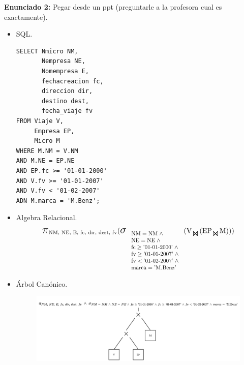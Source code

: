 \documentclass{templateNote}
\begin{document}
\textbf{Enunciado 2:}\newline
Pegar desde un ppt (preguntarle a la profesora cual es exactamente).
\begin{itemize}
    \item SQL.
    \begin{verbatim}
SELECT Nmicro NM,
       Nempresa NE,
       Nomempresa E,
       fechacreacion fc,
       direccion dir,
       destino dest,
       fecha_viaje fv
FROM Viaje V,
     Empresa EP,
     Micro M
WHERE M.NM = V.NM
AND M.NE = EP.NE
AND EP.fc >= '01-01-2000'
AND V.fv >= '01-01-2007'
AND V.fv < '01-02-2007'
ADN M.marca = 'M.Benz';
    \end{verbatim}

    \item Algebra Relacional.
    \begin{align*}
        \scalebox{1.5}{$\pi$}_{\text{NM, NE, E, fc, dir, dest, fv}} (
            \scalebox{1.5}{$\sigma$}_{
                \scalebox{0.8}{
                    $\begin{array}{l}
                        \text{NM} = \text{NM} \; \wedge \\
                        \text{NE} = \text{NE} \; \wedge \\
                        \text{fc} \geq \text{'01-01-2000'} \; \wedge \\
                        \text{fv} \geq \text{'01-01-2007'} \; \wedge \\
                        \text{fv} < \text{'01-02-2007'} \; \wedge  \\
                        \text{marca} = \text{'M.Benz'}
                    \end{array}$
                }
            } (
                \text{V}_{\scalebox{1.3}{$\Join$}} (
                    \text{EP}_{\scalebox{1.3}{$\Join$}} \text{M}
                )
            )
        )
    \end{align*}

    \item \'Arbol Can\'onico.
    \begin{figure}[H]
        \centering
        \includegraphics[width=\textwidth]{img/E6-Canonico.png}
    \end{figure}


\end{itemize}
\end{document}
